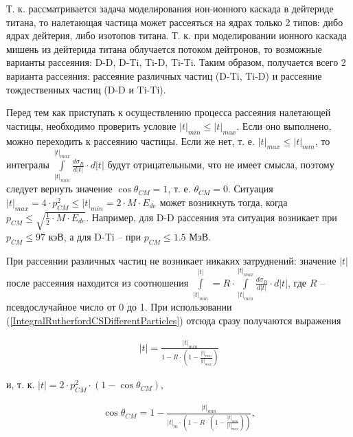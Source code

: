 \documentclass[a4paper,12pt]{article}
\begin{document}
\begin{large}
	Т. к. рассматривается задача моделирования ион-ионного каскада в дейтериде титана, то налетающая частица может рассеяться на ядрах только 2 типов: дибо ядрах дейтерия, либо изотопов титана.
	Т. к. при моделировании ионного каскада мишень из дейтерида титана облучается потоком дейтронов, то возможные варианты рассеяния: D-D, D-Ti, Ti-D, Ti-Ti.
	Таким образом, получается всего 2 варианта рассеяния: рассеяние различных частиц (D-Ti, Ti-D) и рассеяние тождественных частиц (D-D и Ti-Ti).
	
	Перед тем как приступать к осуществлению процесса рассеяния налетающей частицы, необходимо проверить условие $|t|_{min} \leq |t|_{max}$.
	Если оно выполнено, можно переходить к рассеянию частицы.
	Если же нет, т. е. $|t|_{max} \leq |t|_{min}$, то интегралы $\int \limits^{|t|_{max}}_{|t|_{min}} \frac{d\sigma_R}{d|t|} \cdot d|t|$ будут отрицательными, что не имеет смысла, поэтому следует вернуть значение $\cos{\theta_{CM}}=1$, т. е. $\theta_{CM}=0$.
	Ситуация $|t|_{max}=4\cdot p^2_{CM} \leq |t|_{min}=2\cdot M \cdot E_{de}$ может возникнуть тогда, когда $p_{CM} \leq \sqrt{ \frac{1}{2} \cdot M \cdot E_{de} }$.
	Например, для D-D рассеяния эта ситуация возникает при $p_{CM} \leq 97$ кэВ, а для D-Ti -- при $p_{CM} \leq 1.5$ МэВ.
	
	При рассеянии различных частиц не возникает никаких затруднений: значение $|t|$ после рассеяния находится из соотношения $\int \limits^{|t|}_{|t|_{min}}=R \cdot \int \limits^{|t|_{max}}_{|t|_{min}} \frac{d\sigma_R}{d|t|} \cdot d|t|$, где $R$ -- псевдослучайное число от 0 до 1.
	При использовании (\ref{IntegralRutherfordCSDifferentParticles}) отсюда сразу получаются выражения
	
\begin{equation}
\label{TDifferentParticles}
\begin{aligned} 
   |t| = \frac{|t|_{min}}{1-R\cdot \left( 1-\frac{|t|_{min}}{|t|_{max}} \right)} 
\end{aligned}
\end{equation}

	и, т. к. $|t|=2\cdot p^2_{CM} \cdot \left( 1-\cos{\theta_{CM}} \right)$,
	
\begin{equation}
\label{CosThetCMDifferentParticles}
\begin{aligned} 
  \cos{ \theta_{CM}} = 1- \frac{|t|_{min}}{|t|_m \cdot \left( 1-R\cdot \left( 1-\frac{|t|_{min}}{|t|_{max}} \right) \right)},
\end{aligned}
\end{equation}


\end{large}
\end{document}
